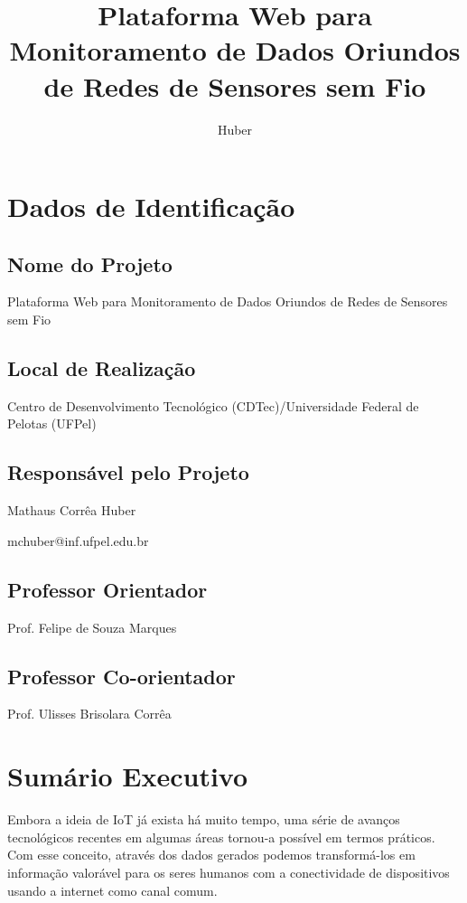 \documentclass[tcc-proposta]{texufpel}
\title{Plataforma Web para Monitoramento de Dados Oriundos de Redes de Sensores sem Fio}
\author{Huber}{Mathaus Corrêa}
\begin{document}

\maketitle 
\sloppy

\chapter{Dados de Identificação}

\section{Nome do Projeto}
Plataforma Web para Monitoramento de Dados Oriundos de Redes de Sensores sem Fio

\section{Local de Realização}
Centro de Desenvolvimento Tecnológico (CDTec)/Universidade Federal de Pelotas (UFPel)

\section{Responsável pelo Projeto}
Mathaus Corrêa Huber

mchuber@inf.ufpel.edu.br

\section{Professor Orientador}
Prof. Felipe de Souza Marques

\section{Professor Co-orientador}
Prof. Ulisses Brisolara Corrêa

\chapter{Sumário Executivo}
Embora a ideia de IoT já exista há muito tempo, uma série de avanços tecnológicos recentes em algumas áreas tornou-a possível em termos práticos. Com esse conceito, através dos dados gerados podemos transformá-los em informação valorável para os seres humanos com a conectividade de dispositivos usando a internet como canal comum.
\\
\end{document}
